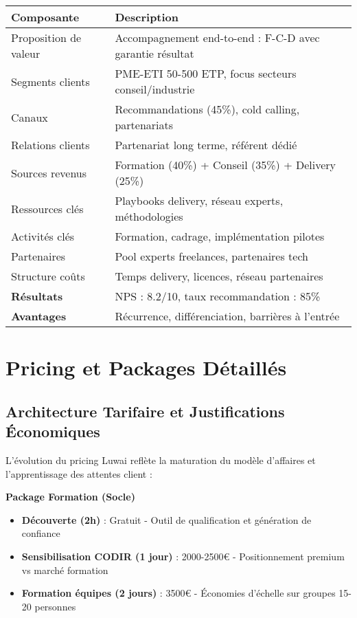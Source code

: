 \begin{longtable}{@{}>{\raggedright\arraybackslash}p{4cm}>{\raggedright\arraybackslash}p{10cm}@{}}
\toprule
\textbf{Composante} & \textbf{Description} \\
\midrule
Proposition de valeur & Accompagnement end-to-end : F-C-D avec garantie résultat \\
Segments clients & PME-ETI 50-500 ETP, focus secteurs conseil/industrie \\
Canaux & Recommandations (45\%), cold calling, partenariats \\
Relations clients & Partenariat long terme, référent dédié \\
Sources revenus & Formation (40\%) + Conseil (35\%) + Delivery (25\%) \\
Ressources clés & Playbooks delivery, réseau experts, méthodologies \\
Activités clés & Formation, cadrage, implémentation pilotes \\
Partenaires & Pool experts freelances, partenaires tech \\
Structure coûts & Temps delivery, licences, réseau partenaires \\
\midrule
\textbf{Résultats} & NPS : 8.2/10, taux recommandation : 85\% \\
\textbf{Avantages} & Récurrence, différenciation, barrières à l'entrée \\
\bottomrule
\end{longtable}

\section{Pricing et Packages Détaillés}

\subsection{Architecture Tarifaire et Justifications Économiques}

L'évolution du pricing Luwai reflète la maturation du modèle d'affaires et l'apprentissage des attentes client :

\textbf{Package Formation (Socle)}
\begin{itemize}
    \item \textbf{Découverte (2h)} : Gratuit - Outil de qualification et génération de confiance
    \item \textbf{Sensibilisation CODIR (1 jour)} : 2000-2500€ - Positionnement premium vs marché formation
    \item \textbf{Formation équipes (2 jours)} : 3500€ - Économies d'échelle sur groupes 15-20 personnes
\end{itemize}

